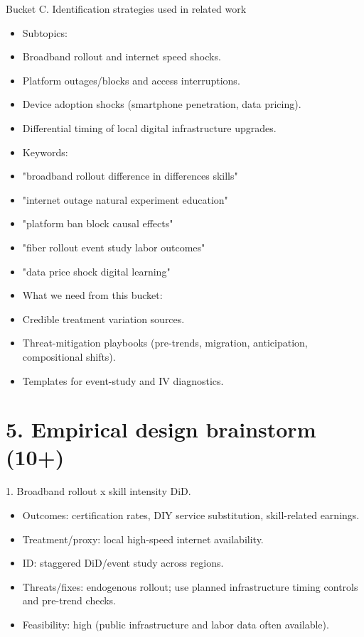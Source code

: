 \documentclass[11pt]{article}
\begin{document}
Bucket C. Identification strategies used in related work\\
\begin{itemize}
\item Subtopics:
\item Broadband rollout and internet speed shocks.
\item Platform outages/blocks and access interruptions.
\item Device adoption shocks (smartphone penetration, data pricing).
\item Differential timing of local digital infrastructure upgrades.
\item Keywords:
\item "broadband rollout difference in differences skills"
\item "internet outage natural experiment education"
\item "platform ban block causal effects"
\item "fiber rollout event study labor outcomes"
\item "data price shock digital learning"
\item What we need from this bucket:
\item Credible treatment variation sources.
\item Threat-mitigation playbooks (pre-trends, migration, anticipation, compositional shifts).
\item Templates for event-study and IV diagnostics.
\end{itemize}

\section*{5. Empirical design brainstorm (10+)}
1. Broadband rollout x skill intensity DiD.\\
\begin{itemize}
\item Outcomes: certification rates, DIY service substitution, skill-related earnings.
\item Treatment/proxy: local high-speed internet availability.
\item ID: staggered DiD/event study across regions.
\item Threats/fixes: endogenous rollout; use planned infrastructure timing controls and pre-trend checks.
\item Feasibility: high (public infrastructure and labor data often available).
\end{itemize}
\end{document}
